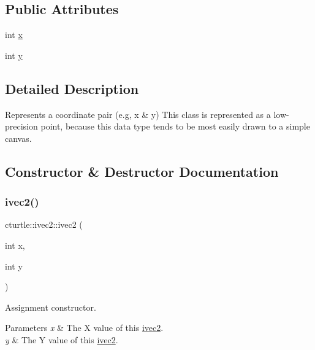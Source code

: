 \subsection*{Public Attributes}
\begin{DoxyCompactItemize}
\item 
int \hyperlink{structcturtle_1_1ivec2_acf8e72e8e3847b3a62f35bfbe588b637}{x}
\item 
int \hyperlink{structcturtle_1_1ivec2_a20914f8516f2f9b8e88e81cdf8415897}{y}
\end{DoxyCompactItemize}


\subsection{Detailed Description}
Represents a coordinate pair (e.\+g, x \& y) This class is represented as a low-\/precision point, because this data type tends to be most easily drawn to a simple canvas. 

\subsection{Constructor \& Destructor Documentation}
\mbox{\label{structcturtle_1_1ivec2_a7069d9f7c5ef7505c7c00c55958e0982}} 
\subsubsection{\texorpdfstring{ivec2()}{ivec2()}}
{\footnotesize\ttfamily cturtle\+::ivec2\+::ivec2 (\begin{DoxyParamCaption}\item[{int}]{x,  }\item[{int}]{y }\end{DoxyParamCaption})\hspace{0.3cm}{\ttfamily [inline]}}



Assignment constructor. 


\begin{DoxyParams}{Parameters}
{\em x} & The X value of this \hyperlink{structcturtle_1_1ivec2}{ivec2}. \\
\hline
{\em y} & The Y value of this \hyperlink{structcturtle_1_1ivec2}{ivec2}. \\
\hline
\end{DoxyParams}


